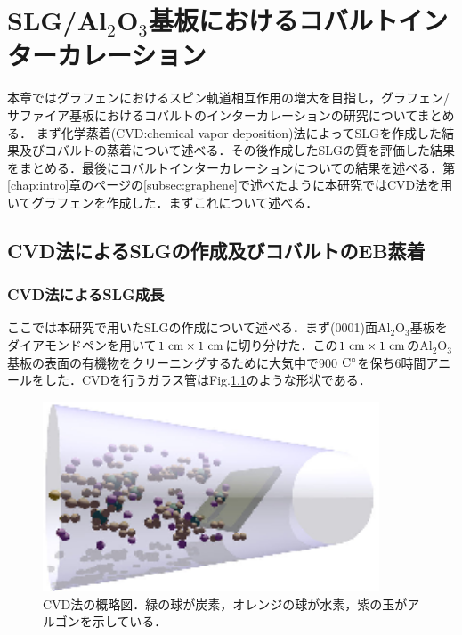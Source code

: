 \chapter{SLG/Al$_{2}$O$_{3}$基板におけるコバルトインターカレーション}

本章ではグラフェンにおけるスピン軌道相互作用の増大を目指し，グラフェン/サファイア基板におけるコバルトのインターカレーションの研究についてまとめる．
まず化学蒸着(CVD:chemical vapor deposition)法によってSLGを作成した結果及びコバルトの蒸着について述べる．その後作成したSLGの質を評価した結果をまとめる．最後にコバルトインターカレーションについての結果を述べる．第\ref{chap:intro}章の\pageref{subsec:graphene}ページの\ref{subsec:graphene}で述べたように本研究ではCVD法を用いてグラフェンを作成した．まずこれについて述べる．

\section{CVD法によるSLGの作成及びコバルトのEB蒸着}
\subsection{CVD法によるSLG成長}
ここでは本研究で用いたSLGの作成について述べる．まず(0001)面Al$_{2}$O$_{3}$基板をダイアモンドペンを用いて$1\rm\ cm \times 1\rm\ cm$に切り分けた．この$1\rm\ cm \times 1\rm\ cm$のAl$_{2}$O$_{3}$基板の表面の有機物をクリーニングするために大気中で900$\rm\ C^{\circ}$を保ち6時間アニールをした．CVDを行うガラス管はFig.\ref{fig:CVD}のような形状である．

\begin{figure}[htbp]
 \begin{center}
  \includegraphics[width=100mm]{images/CVD.eps}
 \end{center}
 \caption{CVD法の概略図．緑の球が炭素，オレンジの球が水素，紫の玉がアルゴンを示している．}
 \label{fig:CVD}
\end{figure}

